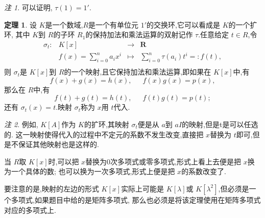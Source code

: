 \documentclass[a4paper,11pt]{article}%
\theoremstyle{remark}
\newtheorem*{remark}{注}
\theoremstyle{definition}
\newtheorem{theorem}{定理}[section]
\theoremstyle{definition}
\theoremstyle{plain}
\begin{document}
\begin{remark}
    可以证明, $\tau(1)=1'.$
\end{remark}
\begin{theorem}
    设 $K$是一个数域,$R$是一个有单位元 $1'$的交换环,它可以看成是 $K$的一个扩环,
    其中 $K$到 $R$的子环 $R_1$的保持加法和乘法运算的双射记作 $\tau$.任意给定 $t \in R$,令
    \[
    \begin{array}{rrcl}
    \sigma_{t} : &  K[x] & \longrightarrow  & \mathbf{R} \\
                   &  f(x)=\sum_{i=0}^{n}{a_ix^i}  & \longmapsto    & \sum_{i=0}^{n}{\tau(a_i)t^i}=:f(t), \\
    \end{array}
    \]
    则 $\sigma_t$是 $K[x]$到 $R$的一个映射,且它保持加法和乘法运算,即如果在 $K[x]$中,有
    \[f(x)+g(x)=h(x),\phantom{111}f(x)g(x)=p(x),\]
    那么在 $R$中,有
    \[f(t)+g(t)=h(t),\phantom{111}f(t)g(t)=p(t);\]
    还有 $\sigma_t(x)=t$.映射 $\sigma_t$称为 $x$用 $t$代入.
\end{theorem}
\begin{remark}
    例如, $K[A]$作为 $K$的扩环,其映射 $\sigma_t$便是从 $a$到 $aI$的映射,但是t是可以任选的.
    这一映射使得代入的过程中不定元的系数不发生改变,直接把 $x$替换为 $t$即可,但是不保证其他映射也是这样的.

    当 $R$取 $K[x]$时,可以把 $x$替换为0次多项式或零多项式,形式上看上去便是把 $x$换为一个具体的数;
    也可以换为一次多项式,形式上便是把 $x$的系数改变了.

    要注意的是,映射的左边的形式 $K[x]$实际上可能是 $K[\lambda]$或 $K[\lambda^2]$,但必须是一个多项式,如果题目中给的是矩阵多项式,
    那么也必须是将该定理使用在矩阵多项式对应的多项式上.
\end{remark}
\end{document}

